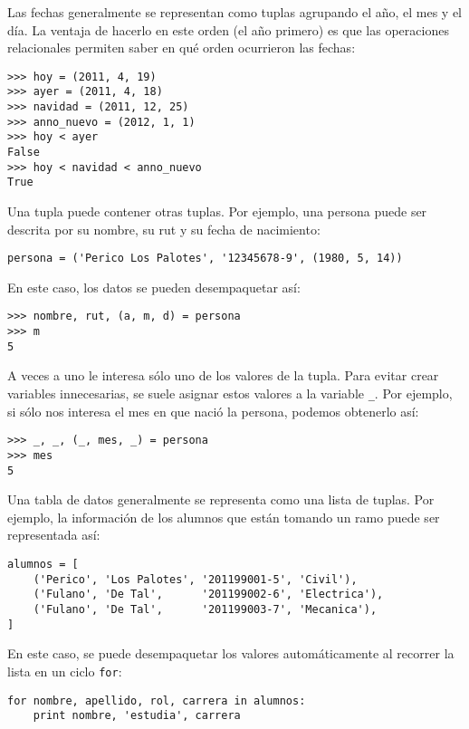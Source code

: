 Las fechas generalmente se representan como tuplas agrupando el año, el
mes y el día. La ventaja de hacerlo en este orden (el año primero) es
que las operaciones relacionales permiten saber en qué orden ocurrieron
las fechas:

\begin{lstlisting}
>>> hoy = (2011, 4, 19)
>>> ayer = (2011, 4, 18)
>>> navidad = (2011, 12, 25)
>>> anno_nuevo = (2012, 1, 1)
>>> hoy < ayer
False
>>> hoy < navidad < anno_nuevo
True
\end{lstlisting}

Una tupla puede contener otras tuplas. Por ejemplo, una persona puede
ser descrita por su nombre, su rut y su fecha de nacimiento:

\begin{lstlisting}
persona = ('Perico Los Palotes', '12345678-9', (1980, 5, 14))
\end{lstlisting}

En este caso, los datos se pueden desempaquetar así:

\begin{lstlisting}
>>> nombre, rut, (a, m, d) = persona
>>> m
5
\end{lstlisting}

A veces a uno le interesa sólo uno de los valores de la tupla. Para
evitar crear variables innecesarias, se suele asignar estos valores a la
variable \lstinline!_!. Por ejemplo, si sólo nos interesa el mes en que
nació la persona, podemos obtenerlo así:

\begin{lstlisting}
>>> _, _, (_, mes, _) = persona
>>> mes
5
\end{lstlisting}

Una tabla de datos generalmente se representa como una lista de tuplas.
Por ejemplo, la información de los alumnos que están tomando un ramo
puede ser representada así:

\begin{lstlisting}
alumnos = [
    ('Perico', 'Los Palotes', '201199001-5', 'Civil'),
    ('Fulano', 'De Tal',      '201199002-6', 'Electrica'),
    ('Fulano', 'De Tal',      '201199003-7', 'Mecanica'),
]
\end{lstlisting}

En este caso, se puede desempaquetar los valores automáticamente al
recorrer la lista en un ciclo \lstinline!for!:

\begin{lstlisting}
for nombre, apellido, rol, carrera in alumnos:
    print nombre, 'estudia', carrera
\end{lstlisting}

